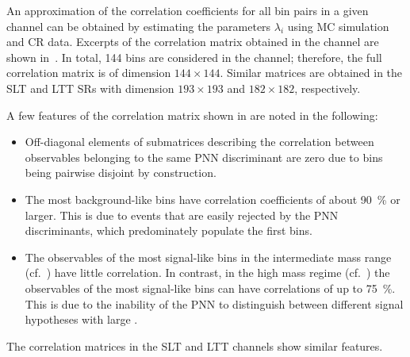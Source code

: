 An approximation of the correlation coefficients for all bin pairs in a given
channel can be obtained by estimating the parameters $\lambda_i$ using MC
simulation and CR data. Excerpts of the correlation matrix obtained in the
\hadhad channel are shown in~. In
total, 144 bins are considered in the \hadhad channel; therefore, the full
correlation matrix is of dimension $144 \times 144$. Similar matrices are
obtained in the \lephad SLT and LTT SRs with dimension $193 \times 193$ and
$182 \times 182$, respectively.

A few features of the correlation matrix shown in
 are noted in the following:
\begin{itemize}

\item Off-diagonal elements of submatrices describing the correlation between
  observables belonging to the same PNN discriminant are zero due to bins being
  pairwise disjoint by construction.

\item The most background-like bins have correlation coefficients of about
  \SI{90}{\percent} or larger. This is due to events that are easily rejected by
  the PNN discriminants, which predominately populate the first bins.

\item The observables of the most signal-like bins in the intermediate mass
  range (cf.~) have little
  correlation. In contrast, in the high mass regime
  (cf.~) the observables of the
  most signal-like bins can have correlations of up to \SI{75}{\percent}. This
  is due to the inability of the PNN to distinguish between different signal
  hypotheses with large \mX.

\end{itemize}
The correlation matrices in the \lephad SLT and LTT channels show similar
features.

